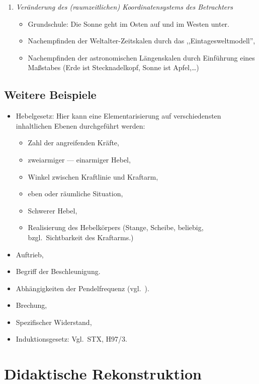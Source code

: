\begin{enumerate}
\item { \it Ver\"{a}nderung des (raumzeitlichen) Koordinatensystems des
Betrachters}
\begin{itemize}
\item Grundschule: Die Sonne geht im Osten auf und im Westen unter.
\item Nachempfinden der Weltalter-Zeitskalen durch das ,,Eintagesweltmodell'',
\item Nachempfinden der astronomischen L\"{a}ngenskalen durch Einf\"{u}hrung eines
Ma{\ss}stabes (Erde ist Stecknadelkopf, Sonne ist Apfel,\dots)
\end{itemize}

\end{enumerate}

\subsection{Weitere Beispiele}
\begin{itemize}
\item
Hebelgesetz: Hier kann eine Elementarisierung auf verschiedensten
inhaltlichen Ebenen durchgef\"{u}hrt werden:
\begin{itemize}
\item Zahl der angreifenden Kr\"{a}fte,
\item zweiarmiger --- einarmiger Hebel,
\item Winkel zwischen Kraftlinie und Kraftarm,
\item eben oder r\"{a}umliche Situation,
\item Schwerer Hebel,
\item Realisierung des Hebelk\"{o}rpers (Stange, Scheibe, beliebig,
bzgl.\ Sichtbarkeit des Kraftarms.)
\end{itemize}

\item Auftrieb,
\item Begriff der Beschleunigung.
\item Abh\"{a}ngigkeiten der Pendelfrequenz (vgl.\ \cite[S.\ 56,
Piaget/Inhelder-Versuch]{Joerger}).
\item Brechung,
\item Spezifischer Widerstand,
\item Induktionsgesetz: Vgl.\ STX, H97/3.

\end{itemize}


\bip\bip
\section{Didaktische Rekonstruktion}

